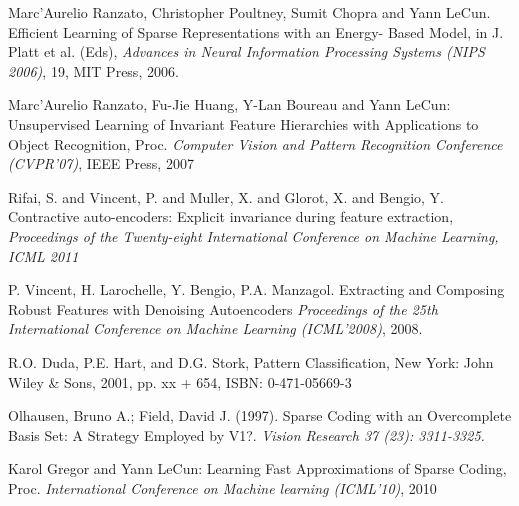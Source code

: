 \documentclass{article} %
\begin{document}
 \begin{thebibliography}{1}

 Marc'Aurelio Ranzato, Christopher Poultney, Sumit Chopra and Yann LeCun. Efficient Learning of Sparse Representations with an Energy-	   Based Model, in J. Platt et al. (Eds), {\em Advances in Neural Information Processing Systems (NIPS 2006)}, 19, MIT Press, 2006.

 Marc'Aurelio Ranzato, Fu-Jie Huang, Y-Lan Boureau and Yann LeCun: Unsupervised Learning of Invariant Feature Hierarchies with Applications to Object Recognition, Proc. {\em Computer Vision and Pattern Recognition Conference (CVPR'07)}, IEEE Press, 2007
 
 Rifai, S. and Vincent, P. and Muller, X. and Glorot, X. and Bengio, Y. Contractive auto-encoders: Explicit invariance during feature extraction, {\em Proceedings of the Twenty-eight International Conference on Machine Learning,  ICML 2011}

 P. Vincent, H. Larochelle, Y. Bengio, P.A. Manzagol. Extracting and Composing Robust Features with Denoising Autoencoders
{\em Proceedings of the 25th International Conference on Machine Learning (ICML'2008)}, 2008.

 R.O. Duda, P.E. Hart, and D.G. Stork, Pattern Classification, New York: John Wiley \& Sons, 2001, pp. xx + 654, ISBN: 0-471-05669-3

 Olhausen, Bruno A.; Field, David J. (1997). Sparse Coding with an Overcomplete Basis Set: A Strategy Employed by V1?. {\em Vision Research 37 (23): 3311-3325.}

 Karol Gregor and Yann LeCun: Learning Fast Approximations of Sparse Coding, Proc. {\em International Conference on Machine learning (ICML'10)}, 2010

\end{thebibliography}
\end{document}
